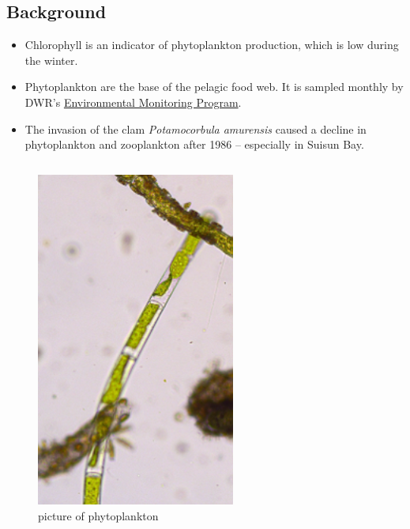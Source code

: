 \documentclass[
]{book}
\providecommand{\tightlist}{%
  \setlength{\itemsep}{0pt}\setlength{\parskip}{0pt}}
\begin{document}
\begin{columns-nocenter}

\begin{column}

\hypertarget{background-2}{%
\subsection{Background}\label{background-2}}

\begin{itemize}
\tightlist
\item
  Chlorophyll is an indicator of phytoplankton production, which is low during the winter.
\item
  Phytoplankton are the base of the pelagic food web. It is sampled monthly by DWR's \href{https://emp.baydeltalive.com/wiki/12297}{Environmental Monitoring Program}.
\item
  The invasion of the clam \emph{Potamocorbula amurensis} caused a decline in phytoplankton and zooplankton after 1986 -- especially in Suisun Bay.
\end{itemize}

\end{column}

\begin{column}

\begin{figure}

{\centering \includegraphics[width=2.57in]{figures/phyto} 

}

\caption{picture of phytoplankton}\label{fig:unnamed-chunk-156}
\end{figure}

\end{column}

\end{columns-nocenter}
\end{document}
